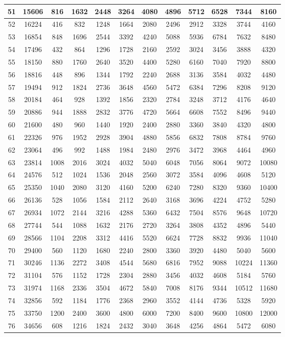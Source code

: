 \begin{center}
\begin{longtable}{|c|c|c|c|c|c|c|c|c|c|c|c|}
\hline
51 & 15606 & 816 & 1632 & 2448 & 3264 & 4080 & 4896 & 5712 & 6528 & 7344 & 8160\tabularnewline
\hline
52 & 16224 & 416 & 832 & 1248 & 1664 & 2080 & 2496 & 2912 & 3328 & 3744 & 4160\tabularnewline
\hline
53 & 16854 & 848 & 1696 & 2544 & 3392 & 4240 & 5088 & 5936 & 6784 & 7632 & 8480\tabularnewline
\hline
54 & 17496 & 432 & 864 & 1296 & 1728 & 2160 & 2592 & 3024 & 3456 & 3888 & 4320\tabularnewline
\hline
55 & 18150 & 880 & 1760 & 2640 & 3520 & 4400 & 5280 & 6160 & 7040 & 7920 & 8800\tabularnewline
\hline
56 & 18816 & 448 & 896 & 1344 & 1792 & 2240 & 2688 & 3136 & 3584 & 4032 & 4480\tabularnewline
\hline
57 & 19494 & 912 & 1824 & 2736 & 3648 & 4560 & 5472 & 6384 & 7296 & 8208 & 9120\tabularnewline
\hline
58 & 20184 & 464 & 928 & 1392 & 1856 & 2320 & 2784 & 3248 & 3712 & 4176 & 4640\tabularnewline
\hline
59 & 20886 & 944 & 1888 & 2832 & 3776 & 4720 & 5664 & 6608 & 7552 & 8496 & 9440\tabularnewline
\hline
60 & 21600 & 480 & 960 & 1440 & 1920 & 2400 & 2880 & 3360 & 3840 & 4320 & 4800\tabularnewline
\hline
61 & 22326 & 976 & 1952 & 2928 & 3904 & 4880 & 5856 & 6832 & 7808 & 8784 & 9760\tabularnewline
\hline
62 & 23064 & 496 & 992 & 1488 & 1984 & 2480 & 2976 & 3472 & 3968 & 4464 & 4960\tabularnewline
\hline
63 & 23814 & 1008 & 2016 & 3024 & 4032 & 5040 & 6048 & 7056 & 8064 & 9072 & 10080\tabularnewline
\hline
64 & 24576 & 512 & 1024 & 1536 & 2048 & 2560 & 3072 & 3584 & 4096 & 4608 & 5120\tabularnewline
\hline
65 & 25350 & 1040 & 2080 & 3120 & 4160 & 5200 & 6240 & 7280 & 8320 & 9360 & 10400\tabularnewline
\hline
66 & 26136 & 528 & 1056 & 1584 & 2112 & 2640 & 3168 & 3696 & 4224 & 4752 & 5280\tabularnewline
\hline
67 & 26934 & 1072 & 2144 & 3216 & 4288 & 5360 & 6432 & 7504 & 8576 & 9648 & 10720\tabularnewline
\hline
68 & 27744 & 544 & 1088 & 1632 & 2176 & 2720 & 3264 & 3808 & 4352 & 4896 & 5440\tabularnewline
\hline
69 & 28566 & 1104 & 2208 & 3312 & 4416 & 5520 & 6624 & 7728 & 8832 & 9936 & 11040\tabularnewline
\hline
70 & 29400 & 560 & 1120 & 1680 & 2240 & 2800 & 3360 & 3920 & 4480 & 5040 & 5600\tabularnewline
\hline
71 & 30246 & 1136 & 2272 & 3408 & 4544 & 5680 & 6816 & 7952 & 9088 & 10224 & 11360\tabularnewline
\hline
72 & 31104 & 576 & 1152 & 1728 & 2304 & 2880 & 3456 & 4032 & 4608 & 5184 & 5760\tabularnewline
\hline
73 & 31974 & 1168 & 2336 & 3504 & 4672 & 5840 & 7008 & 8176 & 9344 & 10512 & 11680\tabularnewline
\hline
74 & 32856 & 592 & 1184 & 1776 & 2368 & 2960 & 3552 & 4144 & 4736 & 5328 & 5920\tabularnewline
\hline
75 & 33750 & 1200 & 2400 & 3600 & 4800 & 6000 & 7200 & 8400 & 9600 & 10800 & 12000\tabularnewline
\hline
76 & 34656 & 608 & 1216 & 1824 & 2432 & 3040 & 3648 & 4256 & 4864 & 5472 & 6080\tabularnewline

\end{longtable}
\end{center}
